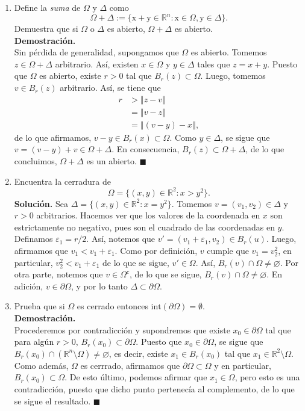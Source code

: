 \documentclass[12pt]{article}
\newcommand{\norm}[1]{\left\Vert#1\right\Vert}
\newcommand{\Int}{\mathrm{int}}
\newcommand{\R}{\mathbb R}
\newcommand{\x}{\mathrm x}
\newcommand{\y}{\mathrm y}
\begin{document}
\begin{enumerate}
\newpage
\item Define la \emph{suma} de $\Omega$ y $\Delta$ como
\[ \Omega + \Delta := \{ \x+\y\in \R^n : \x\in \Omega, \y\in \Delta \}. \]
Demuestra que si $\Omega$ o $\Delta$ es abierto, $\Omega + \Delta$ es abierto. \\
\textbf{Demostración.} \\
Sin pérdida de generalidad, supongamos que $\Omega$ es abierto. Tomemos $z \in \Omega+\Delta$ arbitrario. Así, existen $x \in \Omega$ y $y \in \Delta$
tales que $z=x+y$. Puesto que $\Omega$ es abierto, existe $r>0$ tal que $B_r(z)\subset \Omega$. Luego, tomemos $v \in B_r(z)$ arbitrario. Así, se tiene que
\begin{align*}
    r &> \norm{z-v} \\
    &= \norm{v-z} \\
    &= \norm{(v-y)-x},
\end{align*}
de lo que afirmamos, $v-y \in B_r(x)\subset \Omega$. Como $y\in \Delta$, se sigue que $v=(v-y)+v \in \Omega + \Delta$. En consecuencia, $B_r(z)\subset \Omega+\Delta$,
de lo que concluimos, $\Omega+\Delta$ es un abierto. $\blacksquare$

\newpage
\item Encuentra la cerradura de 
\[ \Omega = \{ (x,y)\in \R^2 : x > y^2 \}. \]
\textbf{Solución.} Sea $\Delta=\{(x,y)\in \R^2:x=y^2\}$. Tomemos $v=(v_1,v_2) \in \Delta$ y $r>0$ arbitrarios. Hacemos ver que los valores de la coordenada en $x$
son estrictamente no negativo, pues son el cuadrado de las coordenadas en $y$. Definamos $\varepsilon_1=r/2$.
Así, notemos que $v'=(v_1+\varepsilon_1,v_2) \in B_r(u)$. Luego, afirmamos que $v_1<v_1+\varepsilon_1$. Como por definición, $v$ cumple que
$v_1=v_2^2$, en particular, $v_2^2 < v_1+\varepsilon_1$ de lo que se sigue, $v'\in \Omega$. Así, $B_r(v)\cap \Omega \neq \varnothing$. Por otra parte, notemos que $v \in \Omega^c$,
de lo que se sigue, $B_r(v)\cap \Omega \neq \varnothing$. En adición, $v \in \partial\Omega$, y por lo tanto $\Delta \subset \partial\Omega.$

\newpage
\item Prueba que si $\Omega$ es cerrado entonces 
$\Int(\partial \Omega)=\emptyset$. \\
\textbf{Demostración.} \\
Procederemos por contradicción y supondremos que existe $x_0 \in \partial\Omega$ tal que para algún $r>0$, $B_r(x_0)\subset \partial\Omega.$ Puesto que
$x_0 \in \partial\Omega$, se sigue que $B_r(x_0)\cap (\R^n\setminus \Omega)\neq \varnothing$, es decir, existe $x_1 \in B_r(x_0)$ tal que $x_1 \in \R^2\setminus \Omega$. Como además,
$\Omega$ es cerrrado, afirmamos que $\partial\Omega \subset \Omega$ y en particular, $B_r(x_0)\subset \Omega$. De esto último, podemos afirmar que $x_1 \in \Omega$, pero esto es una contradicción,
puesto que dicho punto pertenecía al complemento, de lo que se sigue el resultado. $\blacksquare$


\end{enumerate}
\end{document}
